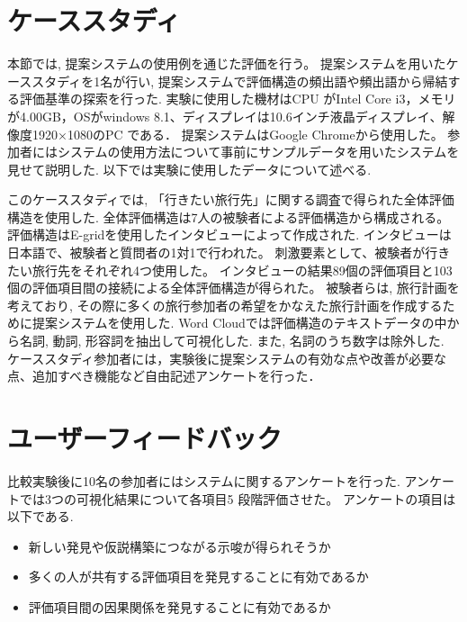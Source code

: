 \documentclass[syuuron]{kuee}
\begin{document}
	\section{ケーススタディ}
		本節では, 提案システムの使用例を通じた評価を行う。
		提案システムを用いたケーススタディを1名が行い, 提案システムで評価構造の頻出語や頻出語から帰結する評価基準の探索を行った. 
		実験に使用した機材はCPU がIntel Core i3，メモリが4.00GB，OSがwindows 8.1、ディスプレイは10.6インチ液晶ディスプレイ、解像度1920×1080のPC である．
		提案システムはGoogle Chromeから使用した。
		参加者にはシステムの使用方法について事前にサンプルデータを用いたシステムを見せて説明した. 以下では実験に使用したデータについて述べる. 
		
		このケーススタディでは, 「行きたい旅行先」に関する調査で得られた全体評価構造を使用した. 
		全体評価構造は7人の被験者による評価構造から構成される。
		評価構造はE-gridを使用したインタビューによって作成された. 
		インタビューは日本語で、被験者と質問者の1対1で行われた。
		刺激要素として、被験者が行きたい旅行先をそれぞれ4つ使用した。
		インタビューの結果89個の評価項目と103個の評価項目間の接続による全体評価構造が得られた。
		被験者らは, 旅行計画を考えており, その際に多くの旅行参加者の希望をかなえた旅行計画を作成するために提案システムを使用した. 
		Word Cloudでは評価構造のテキストデータの中から名詞, 動詞, 形容詞を抽出して可視化した. 
		また, 名詞のうち数字は除外した. 
		ケーススタディ参加者には，実験後に提案システムの有効な点や改善が必要な点、追加すべき機能など自由記述アンケートを行った．
		
	\section{ユーザーフィードバック}
		比較実験後に10名の参加者にはシステムに関するアンケートを行った. 
		アンケートでは3つの可視化結果について各項目5 段階評価させた。
		アンケートの項目は以下である. 
		\begin{itemize}
			\item 新しい発見や仮説構築につながる示唆が得られそうか
			\item 多くの人が共有する評価項目を発見することに有効であるか
			\item 評価項目間の因果関係を発見することに有効であるか
		\end{itemize}
\end{document}
